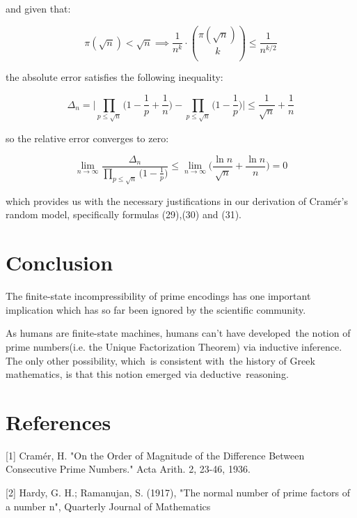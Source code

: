 \documentclass{article}
\begin{document}
and given that:

\begin{equation}
\pi(\sqrt{n}) < \sqrt{n} \implies \frac{1}{n^k} \cdot {\pi(\sqrt{n}) \choose k} \leq \frac{1}{n^{k/2}}
\end{equation}

the absolute error satisfies the following inequality:

\begin{equation}
\Delta_n = \Big\lvert \prod_{p \leq \sqrt{n}} \big(1- \frac{1}{p}+\frac{1}{n}\big) - \prod_{p \leq \sqrt{n}} \big(1- \frac{1}{p}\big)  \Big\rvert \leq \frac{1}{\sqrt{n}} + \frac{1}{n}
\end{equation}

so the relative error converges to zero:

\begin{equation}
\lim_{n \to \infty} \frac{\Delta_n}{\prod_{p \leq \sqrt{n}} \big(1- \frac{1}{p}\big)} \leq \lim_{n \to \infty} \big(\frac{\ln n}{\sqrt{n}} + \frac{\ln n}{n}\big) = 0
\end{equation}

which provides us with the necessary justifications in our derivation of Cramér's random model, specifically
formulas (29),(30) and (31).

\newpage 

\section{Conclusion}

The finite-state incompressibility of prime encodings has one important implication which has so far been ignored by the scientific community. 

As humans are finite-state machines, humans can't have developed the notion of prime numbers(i.e. the Unique Factorization Theorem) via inductive inference. The only other possibility, which is consistent with the history of Greek mathematics, is that this notion emerged via deductive reasoning. 

\section*{References}

\small

[1] Cramér, H. "On the Order of Magnitude of the Difference Between Consecutive Prime Numbers." Acta Arith. 2, 23-46, 1936.

[2] Hardy, G. H.; Ramanujan, S. (1917), "The normal number of prime factors of a number n", Quarterly Journal of Mathematics
\end{document}
